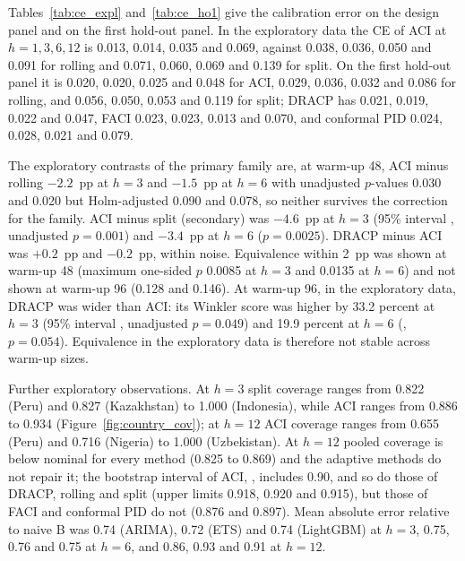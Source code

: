 Tables~\ref{tab:ce_expl} and~\ref{tab:ce_ho1} give the calibration error on the design panel and on the first hold-out panel. In the exploratory data the CE of ACI at $h=1,3,6,12$ is 0.013, 0.014, 0.035 and 0.069, against 0.038, 0.036, 0.050 and 0.091 for rolling and 0.071, 0.060, 0.069 and 0.139 for split. On the first hold-out panel it is 0.020, 0.020, 0.025 and 0.048 for ACI, 0.029, 0.036, 0.032 and 0.086 for rolling, and 0.056, 0.050, 0.053 and 0.119 for split; DRACP has 0.021, 0.019, 0.022 and 0.047, FACI 0.023, 0.023, 0.013 and 0.070, and conformal PID 0.024, 0.028, 0.021 and 0.079.

\begin{table}[t]
\centering
\caption{Calibration error by base model, interval method and horizon, design panel (13 countries, exploratory, warm-up 48).}
\label{tab:ce_expl}
\small
\fittable{}
\end{table}

\begin{table}[t]
\centering
\caption{Calibration error by base model, interval method and horizon, first hold-out panel (7 countries, warm-up 48).}
\label{tab:ce_ho1}
\small
\fittable{}
\end{table}

The exploratory contrasts of the primary family are, at warm-up 48, ACI minus rolling $-2.2$~pp at $h=3$ and $-1.5$~pp at $h=6$ with unadjusted $p$-values 0.030 and 0.020 but Holm-adjusted 0.090 and 0.078, so neither survives the correction for the family. ACI minus split (secondary) was $-4.6$~pp at $h=3$ (95\% interval , unadjusted $p=0.001$) and $-3.4$~pp at $h=6$ ($p=0.0025$). DRACP minus ACI was $+0.2$~pp and $-0.2$~pp, within noise. Equivalence within 2~pp was shown at warm-up 48 (maximum one-sided $p$ 0.0085 at $h=3$ and 0.0135 at $h=6$) and not shown at warm-up 96 (0.128 and 0.146). At warm-up 96, in the exploratory data, DRACP was wider than ACI: its Winkler score was higher by 33.2 percent at $h=3$ (95\% interval , unadjusted $p=0.049$) and 19.9 percent at $h=6$ (, $p=0.054$). Equivalence in the exploratory data is therefore not stable across warm-up sizes.

Further exploratory observations. At $h=3$ split coverage ranges from 0.822 (Peru) and 0.827 (Kazakhstan) to 1.000 (Indonesia), while ACI ranges from 0.886 to 0.934 (Figure~\ref{fig:country_cov}); at $h=12$ ACI coverage ranges from 0.655 (Peru) and 0.716 (Nigeria) to 1.000 (Uzbekistan). At $h=12$ pooled coverage is below nominal for every method (0.825 to 0.869) and the adaptive methods do not repair it; the bootstrap interval of ACI, , includes 0.90, and so do those of DRACP, rolling and split (upper limits 0.918, 0.920 and 0.915), but those of FACI and conformal PID do not (0.876 and 0.897). Mean absolute error relative to naive B was 0.74 (ARIMA), 0.72 (ETS) and 0.74 (LightGBM) at $h=3$, 0.75, 0.76 and 0.75 at $h=6$, and 0.86, 0.93 and 0.91 at $h=12$.

